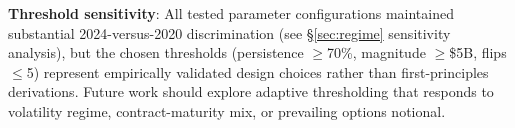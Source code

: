 \noindent\textbf{Threshold sensitivity}: All tested parameter
configurations maintained substantial 2024-versus-2020 discrimination
(see \S\ref{sec:regime} sensitivity analysis), but the chosen thresholds
(persistence $\geq$70\%, magnitude $\geq$\$5B, flips $\leq$5) represent
empirically validated design choices rather than first-principles
derivations. Future work should explore adaptive thresholding that
responds to volatility regime, contract-maturity mix, or prevailing
options notional.
